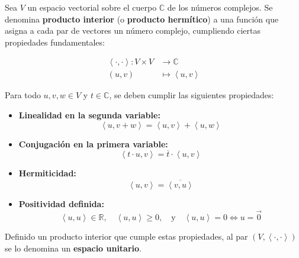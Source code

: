 Sea \(V\) un espacio vectorial sobre el cuerpo \(\mathbb{C}\) de los números complejos. Se denomina \textbf{producto interior} (o \textbf{producto hermítico}) a una función que asigna a cada par de vectores un número complejo, cumpliendo ciertas propiedades fundamentales:

\begin{align*}
  \left\langle \cdot , \cdot \right\rangle : V \times V &\longrightarrow \mathbb{C} \\
  (u, v) &\longmapsto \left\langle u, v \right\rangle
\end{align*}

Para todo \(u, v, w \in V\) y \(t \in \mathbb{C}\), se deben cumplir las siguientes propiedades:

\begin{itemize}
  \item \textbf{Linealidad en la segunda variable:}
  \[
    \left\langle u, v + w \right\rangle = \left\langle u, v \right\rangle + \left\langle u, w \right\rangle
  \]
  \item \textbf{Conjugación en la primera variable:}
  \[
    \left\langle t \cdot u, v \right\rangle = \overline{t} \cdot \left\langle u, v \right\rangle
  \]
  \item \textbf{Hermiticidad:}
  \[
    \left\langle u, v \right\rangle = \overline{ \left\langle v, u \right\rangle }
  \]
  \item \textbf{Positividad definida:}
  \[
    \left\langle u, u \right\rangle \in \mathbb{R}, \quad \left\langle u, u \right\rangle \geq 0, \quad \text{y} \quad \left\langle u, u \right\rangle = 0 \iff u = \vec{0}
  \]
\end{itemize}

Definido un producto interior que cumple estas propiedades, al par \(\left(V, \left\langle \cdot , \cdot \right\rangle\right)\) se lo denomina un \textbf{espacio unitario}.


